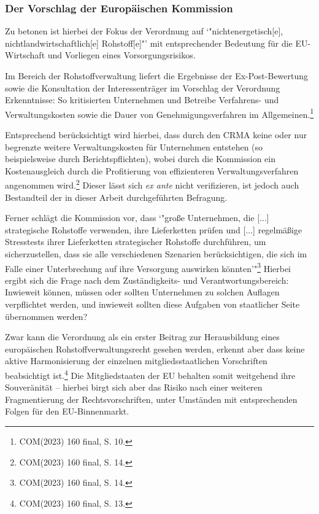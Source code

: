 \documentclass[12pt,a4paper,oneside]{book} %
\begin{document}
	\subsubsection{Der Vorschlag der Europäischen Kommission}
	
	Zu betonen ist hierbei der Fokus der Verordnung auf `"nichtenergetisch[e], nichtlandwirtschaftlich[e] Rohstoff[e]"' mit entsprechender Bedeutung für die EU-Wirtschaft und Vorliegen eines Vorsorgungsrisikos.
	
	Im Bereich der Rohstoffverwaltung liefert die Ergebnisse der Ex-Post-Bewertung sowie die Konsultation der Interessenträger im Vorschlag der Verordnung Erkenntnisse: So kritisierten Unternehmen und Betreibe Verfahrens- und Verwaltungskosten sowie die Dauer von Genehmigungsverfahren im Allgemeinen.\footnote{COM(2023) 160 final, S. 10.}
	
	Entsprechend berücksichtigt wird hierbei, dass durch den CRMA keine oder nur begrenzte weitere Verwaltungskosten für Unternehmen entstehen (so beispielsweise durch Berichtspflichten), wobei durch die Kommission ein Kostenausgleich durch die Profitierung von effizienteren Verwaltungsverfahren angenommen wird.\footnote{COM(2023) 160 final, S. 14.} Dieser lässt sich \textit{ex ante} nicht verifizieren, ist jedoch auch Bestandteil der in dieser Arbeit durchgeführten Befragung. %
	
	Ferner schlägt die Kommission vor, dass `"große Unternehmen, die [...] strategische Rohstoffe verwenden, ihre Lieferketten prüfen und [...] regelmäßige Stresstests ihrer Lieferketten strategischer Rohstoffe durchführen, um sicherzustellen, dass sie alle verschiedenen Szenarien berücksichtigen, die sich im Falle einer Unterbrechung auf ihre Versorgung auswirken
	könnten'"\footnote{COM(2023) 160 final, S. 14.} Hierbei ergibt sich die Frage nach dem Zuständigkeits- und Verantwortungsbereich: Inwieweit können, müssen oder sollten Unternehmen zu solchen Auflagen verpflichtet werden, und inwieweit sollten diese Aufgaben von staatlicher Seite übernommen werden?
	
	Zwar kann die Verordnung als ein erster Beitrag zur Herausbildung eines europäischen Rohstoffverwaltungsrecht gesehen werden, erkennt aber dass keine aktive Harmonisierung der einzelnen mitgliedsstaatlichen Vorschriften beabsichtigt ist.\footnote{COM(2023) 160 final, S. 13.} Die Mitgliedstaaten der EU behalten somit weitgehend ihre Souveränität -- hierbei birgt sich aber das Risiko nach einer weiteren Fragmentierung der Rechtsvorschriften, unter Umständen mit entsprechenden Folgen für den EU-Binnenmarkt.
	
\end{document}
